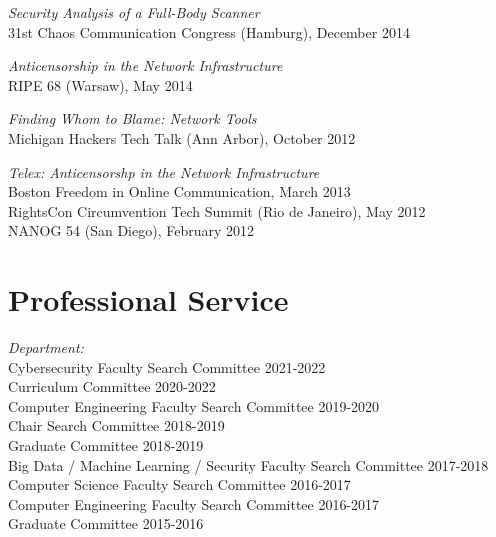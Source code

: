 \documentclass[margin,11pt]{res} %
\begin{document}
\emph{Security Analysis of a Full-Body Scanner} \\
    31st Chaos Communication Congress (Hamburg), December 2014

\emph{Anticensorship in the Network Infrastructure} \\
    RIPE 68 (Warsaw), May 2014


\emph{Finding Whom to Blame: Network Tools} \\
    Michigan Hackers Tech Talk (Ann Arbor), October 2012

\emph{Telex: Anticensorshp in the Network Infrastructure} \\
    Boston Freedom in Online Communication, March 2013\\
    RightsCon Circumvention Tech Summit (Rio de Janeiro), May 2012 \\
    NANOG 54 (San Diego), February 2012 %




\vspace{6pt}
\section{\large Professional Service}

    \emph{Department:}\\
        Cybersecurity Faculty Search Committee 2021-2022 \\
        Curriculum Committee 2020-2022 \\
        Computer Engineering Faculty Search Committee 2019-2020 \\
        Chair Search Committee 2018-2019 \\
        Graduate Committee 2018-2019 \\
        Big Data / Machine Learning / Security Faculty Search Committee 2017-2018 \\
        Computer Science Faculty Search Committee 2016-2017 \\
        Computer Engineering Faculty Search Committee 2016-2017 \\
        Graduate Committee 2015-2016 \\
\end{document}
